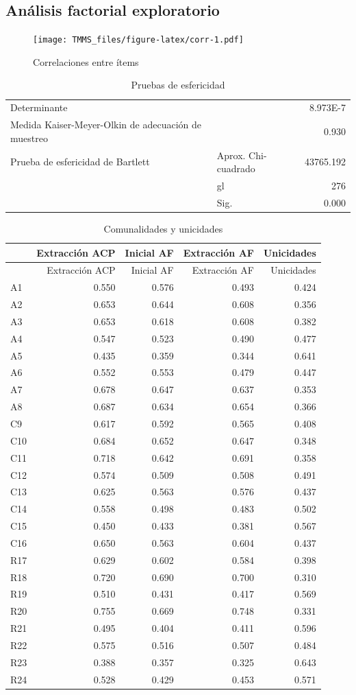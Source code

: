\documentclass[
  10pt,
  spanish,
]{article}
\begin{document}
\hypertarget{anuxe1lisis-factorial-exploratorio}{%
\subsection{Análisis factorial
exploratorio}\label{anuxe1lisis-factorial-exploratorio}}

\begin{figure}
\centering
\texttt{[image: TMMS\_files/figure-latex/corr-1.pdf]}
\caption{Correlaciones entre ítems}
\end{figure}

\begin{longtable}[]{@{}llr@{}}
\caption{Pruebas de esfericidad\label{tab:tab_esfe}}\tabularnewline
\toprule
\endhead
Determinante & & 8.973E-7\tabularnewline
Medida Kaiser-Meyer-Olkin de adecuación de muestreo & &
0.930\tabularnewline
Prueba de esfericidad de Bartlett & Aprox. Chi-cuadrado &
43765.192\tabularnewline
& gl & 276\tabularnewline
& Sig. & 0.000\tabularnewline
\bottomrule
\end{longtable}

\begin{longtable}[]{@{}lrrrr@{}}
\caption{Comunalidades y
unicidades\label{tab:tab_comuni}}\tabularnewline
\toprule
& Extracción ACP & Inicial AF & Extracción AF &
Unicidades\tabularnewline
\midrule
\endfirsthead
\toprule
& Extracción ACP & Inicial AF & Extracción AF &
Unicidades\tabularnewline
\midrule
\endhead
A1 & 0.550 & 0.576 & 0.493 & 0.424\tabularnewline
A2 & 0.653 & 0.644 & 0.608 & 0.356\tabularnewline
A3 & 0.653 & 0.618 & 0.608 & 0.382\tabularnewline
A4 & 0.547 & 0.523 & 0.490 & 0.477\tabularnewline
A5 & 0.435 & 0.359 & 0.344 & 0.641\tabularnewline
A6 & 0.552 & 0.553 & 0.479 & 0.447\tabularnewline
A7 & 0.678 & 0.647 & 0.637 & 0.353\tabularnewline
A8 & 0.687 & 0.634 & 0.654 & 0.366\tabularnewline
C9 & 0.617 & 0.592 & 0.565 & 0.408\tabularnewline
C10 & 0.684 & 0.652 & 0.647 & 0.348\tabularnewline
C11 & 0.718 & 0.642 & 0.691 & 0.358\tabularnewline
C12 & 0.574 & 0.509 & 0.508 & 0.491\tabularnewline
C13 & 0.625 & 0.563 & 0.576 & 0.437\tabularnewline
C14 & 0.558 & 0.498 & 0.483 & 0.502\tabularnewline
C15 & 0.450 & 0.433 & 0.381 & 0.567\tabularnewline
C16 & 0.650 & 0.563 & 0.604 & 0.437\tabularnewline
R17 & 0.629 & 0.602 & 0.584 & 0.398\tabularnewline
R18 & 0.720 & 0.690 & 0.700 & 0.310\tabularnewline
R19 & 0.510 & 0.431 & 0.417 & 0.569\tabularnewline
R20 & 0.755 & 0.669 & 0.748 & 0.331\tabularnewline
R21 & 0.495 & 0.404 & 0.411 & 0.596\tabularnewline
R22 & 0.575 & 0.516 & 0.507 & 0.484\tabularnewline
R23 & 0.388 & 0.357 & 0.325 & 0.643\tabularnewline
R24 & 0.528 & 0.429 & 0.453 & 0.571\tabularnewline
\bottomrule
\end{longtable}
\end{document}
